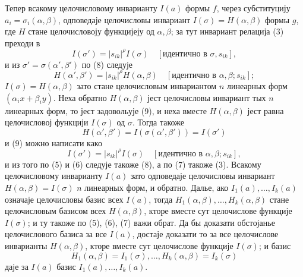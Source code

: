﻿\documentclass[11pt]{article}
\begin{document}
Тепер всакому целочисловому инварианту \(I(a)\) формы \(f\), через субституцију \(a_i=\sigma_i(\alpha,\beta)\), одповедаје целочисловы инвариант \(I(\sigma)=H(\alpha,\beta)\) формы \(g\), где \(H\) стане целочисловоју функцијеју од \(\alpha,\beta\); за тут инвариант релација (3) преходи в
\begin{equation}
        I(\sigma')=|s_{ik}|^\rho I(\sigma)
        \quad [\text{идентично в \(\sigma,s_{ik}\)}],
\end{equation}
и из \(\sigma'=\sigma(\alpha',\beta')\) по (8) следује
\begin{equation}
        H(\alpha',\beta')=|s_{ik}|^\rho H(\alpha,\beta)
        \quad [\text{идентично в \(\alpha,\beta;s_{ik}\)}];
\end{equation}
\(I(\sigma)=H(\alpha,\beta)\) зато стане целочисловым инвариантом \(n\) линеарных форм \((\alpha_i x+\beta_i y)\). Неха обратно \(H(\alpha,\beta)\) јест целочисловы инвариант тых \(n\) линеарных форм, то јест задовольује (9), и неха вместе \(H(\alpha,\beta)\) јест равна целочисловој функцији \(I(\sigma)\) од \(\sigma\). Тогда такоже
\[
        H(\alpha',\beta')=I(\sigma(\alpha',\beta'))=I(\sigma')
\]
и (9) можно написати како
\begin{equation*}
        I(\sigma')=|s_{ik}|^\rho I(\sigma)
        \quad [\text{идентично в \(\alpha,\beta;s_{ik}\)}],\tag{9a}
\end{equation*}
и из того по (5) и (6) следује такоже (8), а по (7) такоже (3). Всакому целочисловому инварианту \(I(a)\) зато одповедаје целочисловы инвариант \(H(\alpha,\beta)=I(\sigma)\) \(n\) линеарных форм, и обратно. Далье, ако \(I_1(a),\ldots,I_k(a)\) означаје целочисловы базис всех \(I(a)\), тогда \(H_1(\alpha,\beta),\ldots,H_k(\alpha,\beta)\) стане целочисловым базисом всех \(H(\alpha,\beta)\), кторе вместе сут целочислове функције \(I(\sigma)\); и ту такоже по (5), (6), (7) важи обрат. Да бы доказати обстојанье целочислового базиса за все \(I(a)\), достаје доказати то за все целочислове инварианты \(H(\alpha,\beta)\), кторе вместе сут целочислове функције \(I(\sigma)\); и базис
\[
        H_1(\alpha,\beta)=I_1(\sigma),\ldots,H_k(\alpha,\beta)=I_k(\sigma)
\]
даје за \(I(a)\) базис \(I_1(a),\ldots,I_k(a)\).
\end{document}
